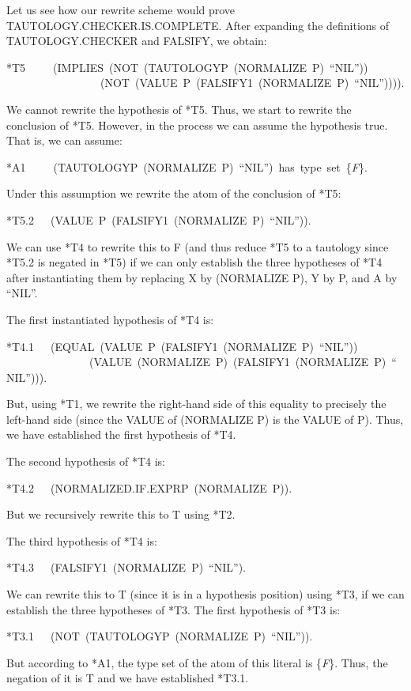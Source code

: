 \documentclass[11pt]{book}
\newenvironment{pubasis}{\begin{flushleft}\ttfamily\small}{\normalsize\rmfamily\end{flushleft}}
\newcommand{\pubinlineunderline}[1]{\emph{#1}}
\begin{document}
Let us see how our rewrite scheme would prove TAU\-TOL\-OGY.CHECK\-ER.IS.COMPLETE.  After expanding the definitions of TAU\-TOL\-OGY.CHECK\-ER and
FALSIFY, we obtain:
\begin{pubasis}
*T5~~~~~(IMPLIES~(NOT~(TAUTOLOGYP~(NORMALIZE~P)~``NIL''))\\
~~~~~~~~~~~~~~~~~(NOT~(VALUE~P~(FALSIFY1~(NORMALIZE~P)~``NIL'')))).\\
\end{pubasis}
We cannot rewrite the hypothesis of *T5.  Thus, we start to
rewrite the conclusion of *T5.  However, in the process we can
assume the hypothesis true.  That is, we can assume:
\begin{pubasis}
*A1~~~~~(TAUTOLOGYP~(NORMALIZE~P)~``NIL'')~has~type~set~\{\pubinlineunderline{F}\}.\\
\end{pubasis}
Under this assumption we rewrite the atom of the conclusion of *T5:
\begin{pubasis}
*T5.2~~~(VALUE~P~(FAL\-SI\-FY1~(NOR\-MAL\-IZE~P)~``NIL'')).\\
\end{pubasis}
We can use *T4 to rewrite this to F (and thus reduce *T5 to a
tautology since *T5.2 is negated in *T5) if we can only
establish the three hypotheses of *T4 after instantiating them
by replacing X by (NORMALIZE P), Y by P, and A by ``NIL''.

The first instantiated hypothesis of *T4 is:
\begin{pubasis}
*T4.1~~~(EQUAL~(VALUE~P~(FAL\-SI\-FY1~(NOR\-MAL\-IZE~P)~``NIL''))\\
~~~~~~~~~~~~~~~(VALUE~(NORMALIZE~P)~(FALSIFY1~(NORMALIZE~P)~``NIL''))).\\
\end{pubasis}
But, using *T1, we  rewrite the right-hand side of this equality
to precisely the left-hand side (since the VALUE of (NORMALIZE P)
is  the VALUE of P).  Thus, we have established the first
hypothesis of *T4.

The second hypothesis of *T4 is:
\begin{pubasis}
*T4.2~~~(NOR\-MAL\-IZED.IF.EXPRP~(NOR\-MAL\-IZE~P)).\\
\end{pubasis}
But we  recursively rewrite this to T using *T2.

The third hypothesis of *T4 is:
\begin{pubasis}
*T4.3~~~(FAL\-SI\-FY1~(NOR\-MAL\-IZE~P)~``NIL'').\\
\end{pubasis}
We can rewrite this to T (since it is in a hypothesis position) using *T3, if
we can establish the three hypotheses of *T3.
The first hypothesis of *T3 is:
\begin{pubasis}
*T3.1~~~(NOT~(TAU\-TOL\-OGYP~(NOR\-MAL\-IZE~P)~``NIL'')).\\
\end{pubasis}
But according to *A1, the type set of the atom of this
literal is \{\pubinlineunderline{F}\}.  Thus, the negation of it is T and we have
established *T3.1.
\end{document}
